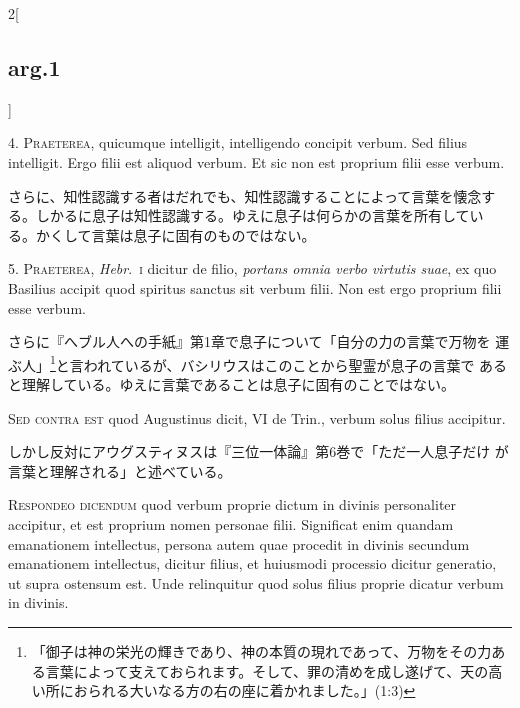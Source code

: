 \documentclass[paper=a4paper,fontsize=10pt,jafontsize=9pt,titlepage]{jlreq}
\begin{document}
\begin{paracol}{2}[\subsection{arg.1}]

4. {\scshape Praeterea}, quicumque intelligit, intelligendo concipit verbum. Sed
filius intelligit. Ergo filii est aliquod verbum. Et sic non est
proprium filii esse verbum.

\switchcolumn

さらに、知性認識する者はだれでも、知性認識することによって言葉を懐念す
 る。しかるに息子は知性認識する。ゆえに息子は何らかの言葉を所有してい
 る。かくして言葉は息子に固有のものではない。


5. {\scshape Praeterea}, {\itshape Hebr}.~{\scshape i} dicitur de filio, {\itshape portans omnia verbo virtutis
suae}, ex quo Basilius accipit quod spiritus sanctus sit verbum
filii. Non est ergo proprium filii esse verbum.

\switchcolumn

さらに『へブル人への手紙』第1章で息子について「自分の力の言葉で万物を
 運ぶ人」\footnote{「御子は神の栄光の輝きであり、神の本質の現れであって、万物をその力ある言葉によって支えておられます。そして、罪の清めを成し遂げて、天の高い所におられる大いなる方の右の座に着かれました。」(1:3)}と言われているが、バシリウスはこのことから聖霊が息子の言葉で
 あると理解している。ゆえに言葉であることは息子に固有のことではない。

\switchcolumn*[\subsection{s.c.}]

{\scshape Sed contra est} quod Augustinus dicit, VI de Trin., verbum solus filius
accipitur.

\switchcolumn

しかし反対にアウグスティヌスは『三位一体論』第6巻で「ただ一人息子だけ
 が言葉と理解される」と述べている。


{\scshape Respondeo dicendum} quod verbum proprie dictum in divinis personaliter
accipitur, et est proprium nomen personae filii. Significat enim
quandam emanationem intellectus, persona autem quae procedit in
divinis secundum emanationem intellectus, dicitur filius, et huiusmodi
processio dicitur generatio, ut supra ostensum est. Unde relinquitur
quod solus filius proprie dicatur verbum in divinis.


\end{paracol}
\end{document}
